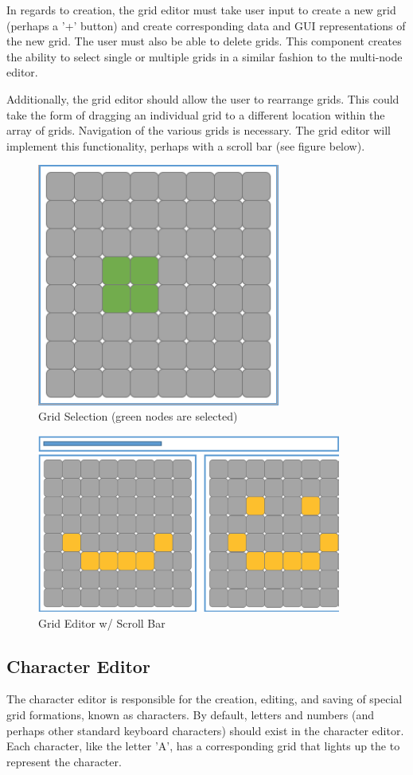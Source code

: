 \documentclass[12pt]{article}
\begin{document}
In regards to creation, the grid editor must take user input to create a new grid (perhaps a '+' button) and create corresponding data and GUI representations of the new grid. The user must also be able to delete grids. This component creates the ability to select single or multiple grids in a similar fashion to the multi-node editor.

Additionally, the grid editor should allow the user to rearrange grids. This could take the form of dragging an individual grid to a different location within the array of grids. Navigation of the various grids is necessary. The grid editor will implement this functionality, perhaps with a scroll bar (see figure below).

\begin{figure}[ht!]
\centering
\includegraphics[width=80mm]{Grid.png}
\caption{Grid Selection (green nodes are selected)}
\end{figure}

\begin{figure}[ht!]
\centering
\includegraphics[width=100mm]{Multi-grid.png}
\caption{Grid Editor w/ Scroll Bar}
\end{figure}
\clearpage

\subsection{Character Editor}
The character editor is responsible for the creation, editing, and saving of special grid formations, known as characters. By default, letters and numbers (and perhaps other standard keyboard characters) should exist in the character editor. Each character, like the letter 'A', has a corresponding grid that lights up the to represent the character.
\end{document}
